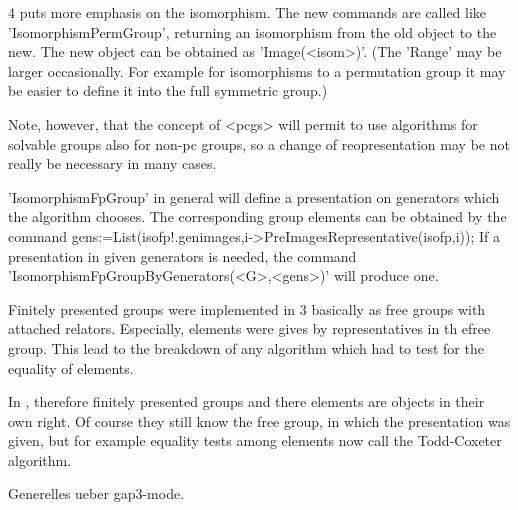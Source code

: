 {\GAP}4 puts more emphasis on the isomorphism. The new commands are called
like 'IsomorphismPermGroup', returning an isomorphism from the old object to
the new. The new object can be obtained as 'Image(<isom>)'. (The 'Range' may
be larger occasionally. For example for isomorphisms to a permutation group
it may be easier to define it into the full symmetric group.)

Note, however, that the concept of <pcgs> will permit to use algorithms for
solvable groups also for non-pc groups, so a change of reopresentation may
be not really be necessary in many cases.

'IsomorphismFpGroup' in general will define a presentation on generators
which the algorithm chooses. The corresponding group elements can be
obtained by the command
\begintt
gens:=List(isofp!.genimages,i->PreImagesRepresentative(isofp,i));
\endtt
If a presentation in given generators is needed, the command
'IsomorphismFpGroupByGenerators(<G>,<gens>)' will produce one.


Finitely presented groups were implemented in {\GAP}3 basically as free
groups with attached relators. Especially, elements were gives by
representatives in th efree group. This lead to the breakdown of any
algorithm which had to test for the equality of elements.

In {}, therefore finitely presented groups and there elements are
objects in their own right. Of course they still know the free group, in
which the presentation was given, but for example equality tests among
elements now call the Todd-Coxeter algorithm. 



Generelles ueber gap3-mode.

